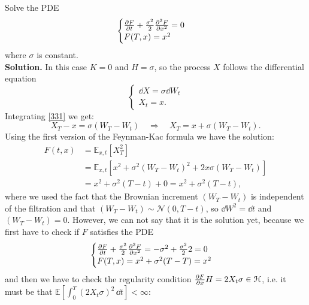 \begin{example}{}{}{}
    Solve the PDE
    \begin{equation*}
        \begin{cases}
        \pdv{F}{t}(t,x) + \frac{\sigma^2}{2}\pdv[2]{F}{x}(t,x) = 0\\
        F(T,x) = x^2
        \end{cases}
    \end{equation*}
    where $\sigma$ is constant.\\
    \textbf{Solution.} In this case $K=0$ and $H=\sigma$, so the process $X$ follows the differential equation
    \begin{equation}\label{331}
        \begin{cases}
        \dd X = \sigma\dd W_t \tag{$\ast$}\\
        X_t = x.
        \end{cases}
    \end{equation}
    Integrating \eqref{331} we get:
    \begin{equation*}
        X_T - x = \sigma(W_T - W_t) \quad\Rightarrow\quad X_T = x + \sigma(W_T - W_t).
    \end{equation*}
    Using the first version of the Feynman-Kac formula we have the solution:
    \begin{align*}
        F(t,x) &= \mathbb{E}_{x,t}[X^2_T] \\
        &=
        \mathbb{E}_{x,t}[x^2 + \sigma^2(W_T - W_t)^2 + 2x\sigma(W_T-W_t)] \\
        &=
        x^2 + \sigma^2(T-t) + 0 = x^2 + \sigma^2(T-t),
    \end{align*}
    where we used the fact that the Brownian increment $(W_T - W_t)$ is independent of the filtration and that $(W_T-W_t)\sim \mathcal{N}(0,T-t)$, so $\dd W^2 = \dd t$ and $(W_T-W_t)=0$. However, we can not say that it is the solution yet, because we first have to check if $F$ satisfies the PDE
    \begin{equation*}
        \begin{cases}
        \pdv{F}{t}(t,x) + \frac{\sigma^2}{2}\pdv[2]{F}{x}(t,x) = -\sigma^2 + \frac{\sigma^2}{2}2 = 0\\
        F(T,x) = x^2 + \sigma^2(T-T) = x^2
        \end{cases}
    \end{equation*}
    and then we have to check the regularity condition $\pdv{F}{x}H = 2X_t\sigma\in\mathcal{H}$, i.e. it must be that $\mathbb{E}\left[\int^T_0 (2X_t\sigma)^2\,\dd t\right] < \infty$:

\end{example}
